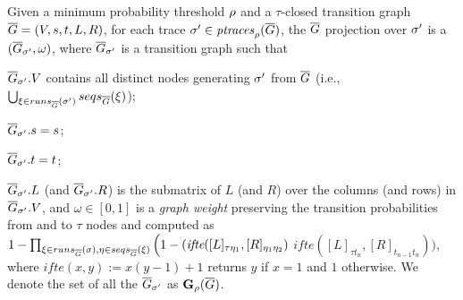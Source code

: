 	\begin{definition}
		Given a minimum probability thre\-shold $\pmin$ and a $\tau$-closed transition graph $\closed{G}=(V,s,t,L,R)$, for each trace $\nonlogtrace\in\ptraces{\closed{G}}{\pmin}$, the $\closed{G}$ projection over $\nonlogtrace$ is a  $(\closed{G}_\nonlogtrace,\omega)$, where $\closed{G}_\nonlogtrace$ is a transition graph such that
\begin{inparaenum}[\it (i)]
	\item $\closed{G}_\nonlogtrace.V$ contains all distinct nodes generating $\nonlogtrace$ from $\closed{G}$	(i.e., $\bigcup_{\xi\in\runs{\nonlogtrace}{\closed{G}}}\seqs{\xi}{ \closed{G}}$);
	\item $\closed{G}_\nonlogtrace.s = s$;
	\item  $\closed{G}_\nonlogtrace.t = t$;
	\item $\closed{G}_\nonlogtrace.L$ (and $\closed{G}_\nonlogtrace.R$) is the submatrix of $L$ (and $R$) over the columns (and rows) in $\closed{G}_\nonlogtrace.V$, and $\omega \in [0,1]$ is a \emph{graph weight} preserving the transition probabilities from and to $\tau$ nodes and computed as $1-\prod_{\xi\in\runs{\sigma}{\closed{G}},\eta\in\seqs{\xi}{\closed{G}}}\Big(1-(\textit{ifte}([L]_{\tau\eta_1},[R]_{\eta_1\eta_2})$
	 $\textit{ifte}([L]_{\tau t_n},[R]_{t_{n-1} t_n})\Big)$,
	where $\textit{ifte}(x,y):=x(y-1)+1$ returns $y$ if $x=1$ and $1$ otherwise. We denote the set of all the $\closed{G}_\nonlogtrace$ as $\TBf{\pmin}{4}(\closed{G})$.
\end{inparaenum}
%		
\end{definition}
